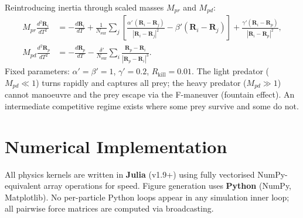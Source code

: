 \documentclass[11pt,a4paper]{article}
\begin{document}
Reintroducing inertia through scaled masses $M_{pr}$ and $M_{pd}$:
\begin{align}
  M_{pr}\frac{d^2\mathbf{R}_i}{dT^2}
    &= -\frac{d\mathbf{R}_i}{dT}
      + \frac{1}{N_\mathrm{sur}}\sum_j
        \!\left[\frac{\alpha'\,(\mathbf{R}_i-\mathbf{R}_j)}{|\mathbf{R}_i-\mathbf{R}_j|^2}
        - \beta'(\mathbf{R}_i-\mathbf{R}_j)\right]
      + \frac{\gamma'(\mathbf{R}_i-\mathbf{R}_p)}{|\mathbf{R}_i-\mathbf{R}_p|^2},
    \label{eq:prey-inertial}\\
  M_{pd}\frac{d^2\mathbf{R}_p}{dT^2}
    &= -\frac{d\mathbf{R}_p}{dT}
      - \frac{\delta'}{N_\mathrm{sur}}\sum_i
        \frac{\mathbf{R}_p - \mathbf{R}_i}{|\mathbf{R}_p-\mathbf{R}_i|^3}.
    \label{eq:pred-inertial}
\end{align}
Fixed parameters: $\alpha'=\beta'=1$, $\gamma'=0.2$, $R_\mathrm{kill}=0.01$.
The light predator ($M_{pd}\ll 1$) turns rapidly and captures all prey;
the heavy predator ($M_{pd}\gg 1$) cannot manoeuvre and the prey escape via
the F-maneuver (fountain effect). An intermediate competitive regime exists
where some prey survive and some do not.

\section{Numerical Implementation}

All physics kernels are written in \textbf{Julia} (v1.9+) using fully
vectorised NumPy-equivalent array operations for speed. Figure generation
uses \textbf{Python} (NumPy, Matplotlib). No per-particle Python loops appear
in any simulation inner loop; all pairwise force matrices are computed via
broadcasting.
\end{document}
